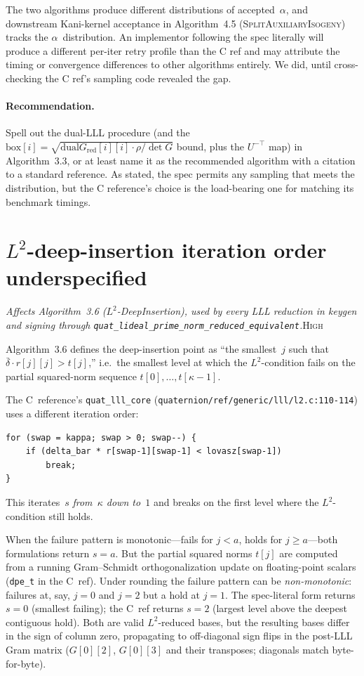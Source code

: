 \documentclass[a4paper,11pt]{article}
\newcommand{\algo}[1]{Algorithm~#1}
\newcommand{\high}{\textsc{\color{BurntOrange}High}}
\newcommand{\finding}[2]{\noindent\textit{#1}\hfill#2\par\smallskip}
\begin{document}
The two algorithms produce different distributions of accepted~$\alpha$,
and downstream Kani-kernel acceptance in
\algo{4.5} (\textsc{SplitAuxiliaryIsogeny}) tracks the
$\alpha$~distribution.  An implementor following the spec literally
will produce a different per-iter retry profile than the C ref and
may attribute the timing or convergence differences to other
algorithms entirely.  We did, until cross-checking the C ref's
sampling code revealed the gap.

\paragraph{Recommendation.}
Spell out the dual-LLL procedure (and the
$\mathrm{box}[i] = \sqrt{\mathrm{dual}G_{\mathrm{red}}[i][i]
\cdot \rho / \det G}$ bound, plus the $U^{-\top}$ map) in
\algo{3.3}, or at least name it as the recommended algorithm
with a citation to a standard reference.  As stated, the spec
permits any sampling that meets the distribution, but the C
reference's choice is the load-bearing one for matching its
benchmark timings.

\section{\texorpdfstring{$L^2$}{L2}-deep-insertion iteration order
underspecified}
\label{sec:l2-deep-insertion-order}

\finding{Affects \algo{3.6} ($L^2$-DeepInsertion), used by every
LLL reduction in keygen and signing through
\texttt{quat\_lideal\_prime\_norm\_reduced\_equivalent}.}{\high}

\algo{3.6} defines the deep-insertion point as ``the smallest~$j$
such that $\bar\delta \cdot r[j][j] > t[j]$,'' i.e.\ the smallest
level at which the $L^2$-condition fails on the partial squared-norm
sequence $t[0], \ldots, t[\kappa-1]$.

The C~reference's \texttt{quat\_lll\_core}
(\texttt{quaternion/ref/generic/lll/l2.c:110-114}) uses a different
iteration order:
\begin{verbatim}
for (swap = kappa; swap > 0; swap--) {
    if (delta_bar * r[swap-1][swap-1] < lovasz[swap-1])
        break;
}
\end{verbatim}
This iterates~$s$ \emph{from~$\kappa$ down to~$1$} and breaks on the
first level where the $L^2$-condition still holds.

When the failure pattern is monotonic---fails for $j < a$, holds
for $j \ge a$---both formulations return $s = a$.  But the partial
squared norms $t[j]$ are computed from a running Gram--Schmidt
orthogonalization update on floating-point scalars (\texttt{dpe\_t}
in the C~ref).  Under rounding the failure pattern can be
\emph{non-monotonic}: failures at, say, $j = 0$ and $j = 2$ but a
hold at $j = 1$.  The spec-literal form returns $s = 0$
(smallest failing); the C~ref returns $s = 2$ (largest level above
the deepest contiguous hold).  Both are valid $L^2$-reduced bases,
but the resulting bases differ in the sign of column zero,
propagating to off-diagonal sign flips in the post-LLL Gram matrix
($G[0][2]$, $G[0][3]$ and their transposes; diagonals match
byte-for-byte).
\end{document}
